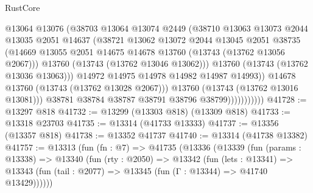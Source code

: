 \begin{lexlean}{RustCore}
\begin{coremodule}
                                @13064
                                @13076
                                (@38703
                                  @13064
                                  @13074
                                  @2449
                                  (@38710
                                    @13063
                                    @13073
                                    @2044
                                    @13035
                                    @2051
                                    @14637
                                    (@38721
                                      @13062
                                      @13072
                                      @2044
                                      @13045
                                      @2051
                                      @38735
                                      (@14669
                                        @13055
                                        @2051
                                        @14675
                                        @14678
                                        @13760
                                        (@13743 (@13762 @13056 @2067)))
                                      @13760
                                      (@13743 (@13762 @13046 @13062)))
                                    @13760
                                    (@13743 (@13762 @13036 @13063)))
                                  @14972
                                  @14975
                                  @14978
                                  @14982
                                  @14987
                                  @14993))
                              @14678
                              @13760
                              (@13743 (@13762 @13028 @2067)))
                            @13760
                            (@13743 (@13762 @13016 @13081)))
                          @38781
                          @38784
                          @38787
                          @38791
                          @38796
                          @38799)))))))))))
@41728 := @13297 @818
@41732 := @13299 (@13303 @818) (@13309 @818)
@41733 := @13318 @23703
@41735 := @13314 (@41733 @13333)
@41737 := @13356 (@13357 @818)
@41738 := @13352 @41737
@41740 := @13314 (@41738 @13382)
@41757 := @13313
    (fun (fn : @7) =>
    @41735
      (@13336
        (@13339
          (fun (params : @13338) =>
          @13340
            (fun (rty : @2050) =>
            @13342
              (fun (lets : @13341) =>
              @13343 (fun (tail : @2077) => @13345 (fun (Γ : @13344) => @41740 @13429))))))

\end{coremodule}
\end{lexlean}
